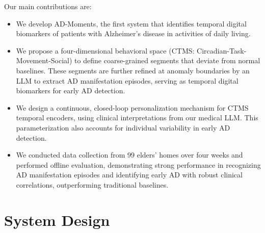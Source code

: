 \documentclass[sigconf, anonymous, 9pt, nonacm]{acmart}
\newcommand{\sys}{AD-Moments\xspace}
\begin{document}
Our main contributions are:
\begin{itemize}
\item We develop \sys, the first system that identifies temporal digital biomarkers of patients with Alzheimer's disease in activities of daily living.
\item We propose a four-dimensional behavioral space (CTMS: Circadian-Task-Movement-Social) to define coarse-grained segments that deviate from normal baselines. These segments are further refined at anomaly boundaries by an LLM to extract AD manifestation episodes, serving as temporal digital biomarkers for early AD detection.

\item We design a continuous, closed-loop personalization mechanism for CTMS temporal encoders, using clinical interpretations from our medical LLM.
This parameterization also accounts for individual variability in early AD detection.


\item We conducted data collection from 99 elders' homes over four weeks and performed offline evaluation, demonstrating strong performance in recognizing AD manifestation episodes and identifying early AD with robust clinical correlations, outperforming traditional baselines.
\end{itemize}



\section{System Design}
\label{sec:design}
\end{document}
